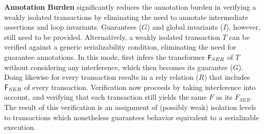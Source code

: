 \textbf{Annotation Burden} \thetool significantly reduces the
annotation burden in verifying a weakly isolated transactions by
eliminating the need to annotate intermediate assertions and loop
invariants.  Guarantees ($G$) and global invariants ($I$), however,
still need to be provided. Alternatively, a weakly isolated
transaction $T$ can be verified against a generic serializability
condition,  eliminating the need for guarantee annotations. In this
mode, \thetool first infers the transformer ${\sf F}_{SER}$ of $T$ without
considering any interference, which then becomes its guarantee ($G$).
Doing likewise for every transaction results in a rely relation ($R$)
that includes ${\sf F}_{SER}$ of every transaction. Verification now
proceeds by taking interference into account, and verifying that each
transaction still yields the same $F$ as its $F_{SER}$. The result of
this verification is an assignment of (possibly weak) isolation levels
to transactions which nonetheless guarantees behavior equivalent to a
serializable execution.



